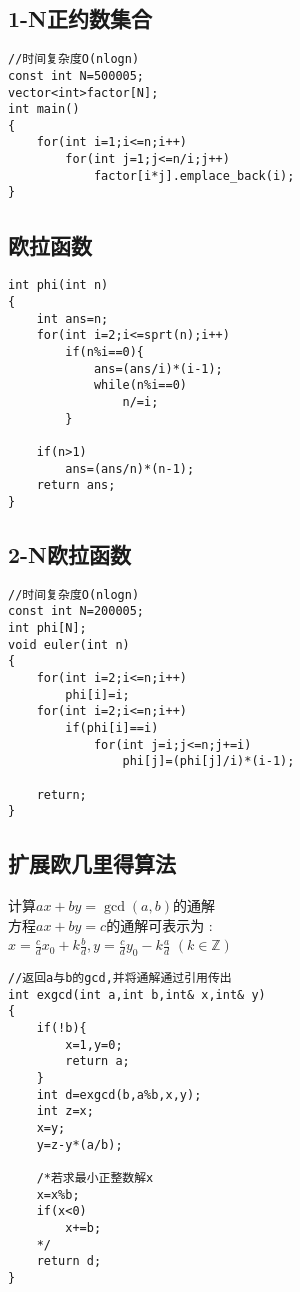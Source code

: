 \documentclass[twocolumn,a4]{article}
\begin{document}
\subsection{1-N正约数集合}
\begin{lstlisting}
//时间复杂度O(nlogn)
const int N=500005;
vector<int>factor[N];
int main()
{
    for(int i=1;i<=n;i++)
        for(int j=1;j<=n/i;j++)
            factor[i*j].emplace_back(i);
}
\end{lstlisting}

\subsection{欧拉函数}
\begin{lstlisting}
int phi(int n)
{
    int ans=n;
    for(int i=2;i<=sprt(n);i++)
        if(n%i==0){
            ans=(ans/i)*(i-1);
            while(n%i==0)
                n/=i;
        }
    
    if(n>1)
        ans=(ans/n)*(n-1);
    return ans;
}
\end{lstlisting}

\subsection{2-N欧拉函数}
\begin{lstlisting}
//时间复杂度O(nlogn)
const int N=200005;
int phi[N];
void euler(int n)
{
    for(int i=2;i<=n;i++)
        phi[i]=i;
    for(int i=2;i<=n;i++)
        if(phi[i]==i)
            for(int j=i;j<=n;j+=i)
                phi[j]=(phi[j]/i)*(i-1);
    
    return;
}
\end{lstlisting}

\subsection{扩展欧几里得算法}
计算$ax+by=\gcd(a,b)$的通解\\
方程$ax+by=c$的通解可表示为 :\\
$x=\frac{c}{d}x_{0}+k\frac{b}{d},y=\frac{c}{d}y_{0}-k\frac{a}{d}$ $(k\in\mathbb{Z})$
\begin{lstlisting}
//返回a与b的gcd,并将通解通过引用传出
int exgcd(int a,int b,int& x,int& y)
{
    if(!b){
        x=1,y=0;
        return a;
    }
    int d=exgcd(b,a%b,x,y);
    int z=x;
    x=y;
    y=z-y*(a/b);

    /*若求最小正整数解x
    x=x%b;
    if(x<0)
        x+=b;
    */
    return d;
}
\end{lstlisting}
\end{document}
